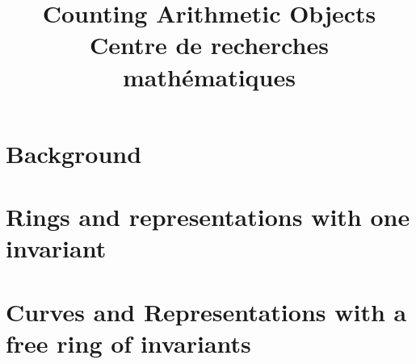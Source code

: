 \documentclass[12pt, twoside,letterpaper,smaller]{amsbook}
\theoremstyle{plain}
\theoremstyle{definition}
\numberwithin{equation}{chapter}
\begin{document}
\title{Counting Arithmetic Objects \\ Centre de recherches math\'{e}matiques}
\maketitle
\tableofcontents

% 
% 
%



\part{Background}









\part{Rings and representations with one invariant}
















\part{Curves and Representations with a free ring of invariants}





















\clearpage
\printindex
\end{document}
